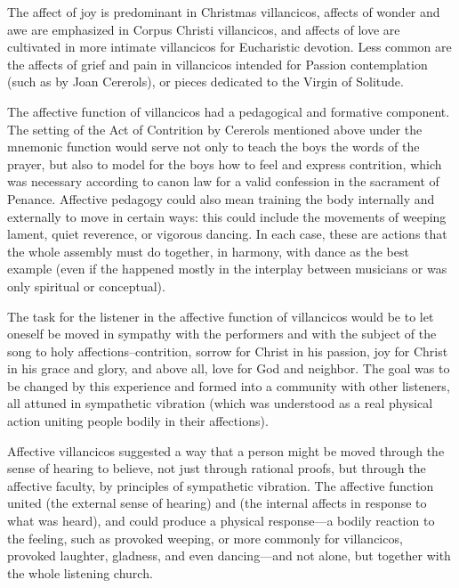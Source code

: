 The affect of joy is predominant in Christmas villancicos, affects of wonder and awe are emphasized in Corpus Christi villancicos, and affects of love are cultivated in more intimate villancicos for Eucharistic devotion. 
Less common are the affects of grief and pain in villancicos intended for Passion contemplation (such as  by Joan Cererols), or pieces dedicated to the Virgin of Solitude.%
	\autocite{Cererols:MEM-VC}

The affective function of villancicos had a pedagogical and formative component.
The setting of the Act of Contrition  by Cererols mentioned above under the mnemonic function would serve not only to teach the boys the words of the prayer, but also to model for the boys how to feel and express contrition, which was necessary according to canon law for a valid confession in the sacrament of Penance. 
Affective pedagogy could also mean training the body internally and externally to move in certain ways: this could include the movements of weeping lament, quiet reverence, or vigorous dancing.
In each case, these are actions that the whole assembly must do together, in harmony, with dance as the best example (even if the  happened mostly in the interplay between musicians or was only spiritual or conceptual).

The task for the listener in the affective function of villancicos would be to let oneself be moved in sympathy with the performers and with the subject of the song to holy affections--contrition, sorrow for Christ in his passion, joy for Christ in his grace and glory, and above all, love for God and neighbor.
The goal was to be changed by this experience and formed into a community with other listeners, all attuned in sympathetic vibration (which was understood as a real physical action uniting people bodily in their affections).

Affective villancicos suggested a way that a person might be moved through the sense of hearing to believe, not just through rational proofs, but through the affective faculty, by principles of sympathetic vibration.
The affective function united  (the external sense of hearing) and  (the internal affects in response to what was heard), and could produce a physical response---a bodily reaction to the feeling, such as provoked weeping, or more commonly for villancicos, provoked laughter, gladness, and even dancing---and not alone, but together with the whole listening church.


